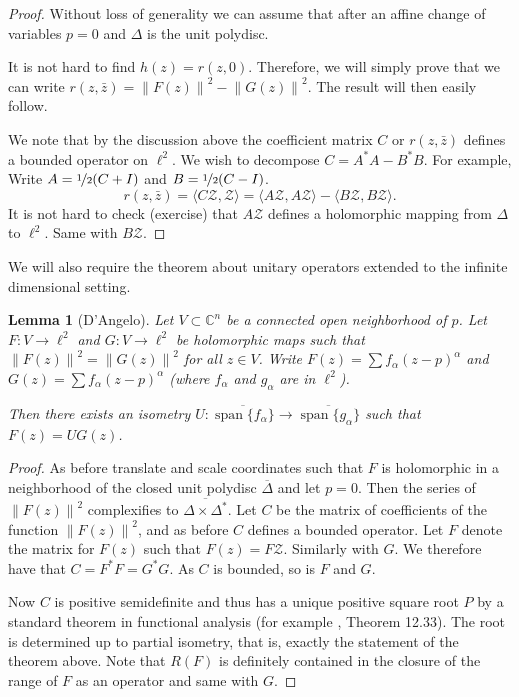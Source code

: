 \documentclass[12pt,openany]{book}
\newcommand{\norm}[1]{\left\lVert {#1} \right\rVert}
\newcommand{\C}{{\mathbb{C}}}
\newcommand{\sZ}{{\mathcal{Z}}}
\theoremstyle{plain}
\newtheorem{lemma}[thm]{Lemma}
\theoremstyle{remark}
\theoremstyle{definition}
\theoremstyle{exercise}
\theoremstyle{example}
\begin{document}
\begin{proof}
Without loss of generality we can assume that after an affine
change of variables $p =0$ and $\Delta$ is the unit polydisc.

It is not hard to find $h(z) = r(z,0)$.  Therefore, we will simply prove
that we can write 
$r(z,\bar{z}) = \norm{F(z)}^2 - \norm{G(z)}^2$.  The result will then easily
follow.

We note that by the discussion above the coefficient matrix $C$ or
$r(z,\bar{z})$ defines
a bounded operator on $\ell^2$.  We wish to decompose $C = A^*A - B^*B$.  For example,
Write $A = \nicefrac{1}{2} (C+I)$ and $B = \nicefrac{1}{2} (C-I)$.
\begin{equation}
r(z,\bar{z}) = \langle C \sZ , \sZ \rangle
=
\langle A \sZ , A \sZ \rangle
-
\langle B \sZ , B \sZ \rangle .
\end{equation}
It is not hard to check (exercise) that $A \sZ$ defines a holomorphic mapping from
$\Delta$ to $\ell^2$.  Same with $B \sZ$.
\end{proof}

We will also require the theorem about unitary operators extended to the
infinite dimensional setting.

\begin{lemma}[D'Angelo] \label{lemma:extU}
Let $V \subset \C^n$ be a connected open neighborhood of $p$.
Let $F \colon V \to \ell^2$ and 
$G \colon V \to \ell^2$ be holomorphic maps such that
$\norm{F(z)}^2 = \norm{G(z)}^2$ for all $z \in V$. 
Write $F(z) = \sum f_\alpha (z-p)^\alpha$ and 
$G(z) = \sum f_\alpha (z-p)^\alpha$ (where $f_\alpha$ and $g_\alpha$ are in
$\ell^2$).

Then 
there exists an isometry $U \colon
\overline{\operatorname{span}\{f_\alpha\}}
\to
\overline{\operatorname{span}\{g_\alpha\}}$
such that
$F(z) = U G(z)$.
\end{lemma}

\begin{proof}
As before translate and scale coordinates
such that $F$ is holomorphic in a neighborhood of
the closed unit polydisc $\overline{\Delta}$ and let $p=0$.
Then the series of $\norm{F(z)}^2$ complexifies to
$\overline{\Delta \times \Delta^*}$.
Let $C$ be the matrix
of coefficients of the function $\norm{F(z)}^2$, and as before $C$
defines a bounded operator.
  Let $F$ denote the
matrix for $F(z)$ such that $F(z) = F \sZ$.  Similarly with $G$.  We
therefore have that $C = F^*F = G^*G$.  As $C$ is bounded, so is $F$ and $G$.

Now $C$ is positive semidefinite and thus has a unique positive square root
$P$ by a standard theorem in functional analysis (for example
\cite{Rudin:fanal}, Theorem 12.33).  The root is determined up to partial isometry, that is,
exactly the statement of the theorem above.  Note that $R(F)$ is definitely
contained in the closure of the range of $F$ as an operator and same with
$G$.
\end{proof}
\end{document}
